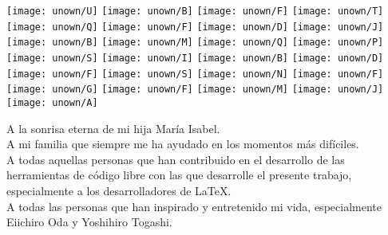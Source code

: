 {\texttt{[image: unown/U]}
\texttt{[image: unown/B]}
\texttt{[image: unown/F]}
\texttt{[image: unown/T]}
\texttt{[image: unown/Q]}
\texttt{[image: unown/F]}
\texttt{[image: unown/D]}
\texttt{[image: unown/J]}
\texttt{[image: unown/B]}
\texttt{[image: unown/M]}
\texttt{[image: unown/Q]}
\texttt{[image: unown/P]}
\texttt{[image: unown/S]}
\texttt{[image: unown/I]}
\texttt{[image: unown/B]}
\texttt{[image: unown/D]}
\texttt{[image: unown/F]}
\texttt{[image: unown/S]}
\texttt{[image: unown/N]}
\texttt{[image: unown/F]}
\texttt{[image: unown/G]}
\texttt{[image: unown/F]}
\texttt{[image: unown/M]}
\texttt{[image: unown/J]}
\texttt{[image: unown/A]}
}

\vspace{5cm}

\begin{flushright}%
\begin{minipage}{0.7\textwidth}%
        \begin{flushright}%
                {\noindent A la sonrisa eterna de mi hija María Isabel.\\
                A mi familia que siempre me ha ayudado en los momentos más difíciles.\\
                A todas aquellas personas que han contribuido en el desarrollo de las herramientas de código 
		libre con las que desarrolle el presente trabajo, especialmente a los desarrolladores de 
		\LaTeX.\\
                A todas las personas que han inspirado y entretenido mi vida, especialmente Eiichiro Oda y 
		Yoshihiro Togashi.\\}
        \end{flushright}
\end{minipage}
\end{flushright}

\vspace{3.5cm}
